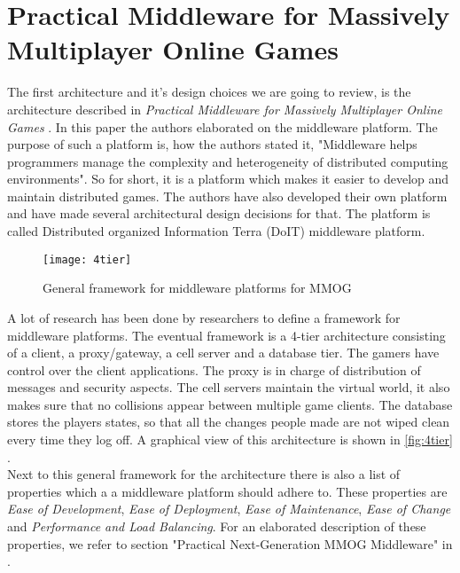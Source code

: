 \section*{Practical Middleware for Massively Multiplayer Online Games}
The first architecture and it's design choices we are going to review, is the architecture described in \emph{Practical Middleware for Massively Multiplayer Online Games} \cite{middleware}.
In this paper the authors elaborated on the middleware platform. 
The purpose of such a platform is, how the authors stated it, "Middleware helps programmers manage the complexity and heterogeneity of distributed computing environments". 
So for short, it is a platform which makes it easier to develop and maintain distributed games. The authors have also developed their own platform and have made several architectural design decisions for that. 
The platform is called Distributed organized Information Terra (DoIT) middleware platform. \\

\begin{wrapfigure}{r}{0.5\textwidth}
\begin{center}
\texttt{[image: 4tier]}
\caption{General framework for middleware platforms for MMOG}
\label{fig:4tier}
\end{center}
\end{wrapfigure}

\noindent A lot of research has been done by researchers to define a framework for middleware platforms. 
The eventual framework is a 4-tier architecture consisting of a client, a proxy/gateway, a cell server and a database tier. 
The gamers have control over the client applications. 
The proxy is in charge of distribution of messages and security aspects. 
The cell servers maintain the virtual world, it also makes sure that no collisions appear between multiple game clients. 
The database stores the players states, so that all the changes people made are not wiped clean every time they log off. 
A graphical view of this architecture is shown in \autoref{fig:4tier} \cite{midfig}. \\
\indent Next to this general framework for the architecture there is also a list of properties which a a middleware platform should adhere to. 
These properties are \emph{Ease of Development}, \emph{Ease of Deployment}, \emph{Ease of Maintenance}, \emph{Ease of Change} and \emph{Performance and Load Balancing}. 
For an elaborated description of these properties, we refer to section "Practical Next-Generation MMOG Middleware" in \cite{middleware}.\\

